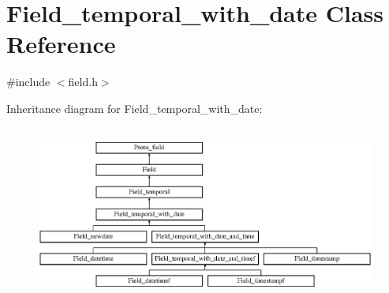 \hypertarget{classField__temporal__with__date}{}\section{Field\+\_\+temporal\+\_\+with\+\_\+date Class Reference}
\label{classField__temporal__with__date}


{\ttfamily \#include $<$field.\+h$>$}

Inheritance diagram for Field\+\_\+temporal\+\_\+with\+\_\+date\+:\begin{figure}[H]
\begin{center}
\leavevmode
\includegraphics[height=5.833333cm]{classField__temporal__with__date}
\end{center}
\end{figure}
